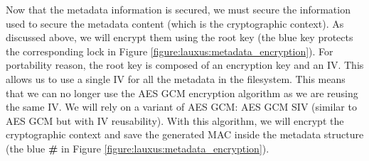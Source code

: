 \documentclass[../main.tex]{subfiles}
\begin{document}
\medbreak
\par Now that the metadata information is secured, we must secure the information used to secure the metadata content (which is the cryptographic context). As discussed above, we will encrypt them using the root key (the blue key protects the corresponding lock in Figure \ref{figure:lauxus:metadata_encryption}). For portability reason, the root key is composed of an encryption key and an IV. This allows us to use a single IV for all the metadata in the filesystem. This means that we can no longer use the AES GCM encryption algorithm as we are reusing the same IV. We will rely on a variant of AES GCM: AES GCM SIV (similar to AES GCM but with IV reusability). With this algorithm, we will encrypt the cryptographic context and save the generated MAC inside the metadata structure (the blue \textbf{\#} in Figure \ref{figure:lauxus:metadata_encryption}).
\end{document}

